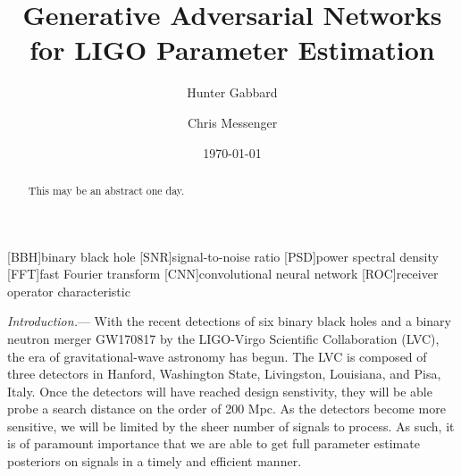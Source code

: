 \documentclass[%
showpacs,
 amsmath,amssymb,
 aps,
 twocolumn,
 prl,
 reprint,
floatfix,
]{revtex4-1}
\newcommand{\dcc}{LIGO-P1700378}
\begin{document}

%
%
\title{Generative Adversarial Networks for LIGO Parameter Estimation}

\author{Hunter Gabbard}
\author{Chris Messenger}

\date{\today}%


%
%
\begin{abstract} 
%
This may be an abstract one day.
%
\end{abstract}





\maketitle

[BBH]{binary black hole}
[SNR]{signal-to-noise ratio}
[PSD]{power spectral density}
[FFT]{fast Fourier transform}
[CNN]{convolutional neural network}
[ROC]{receiver operator characteristic}


%
%

%
%
\textit{Introduction.}--- 
%
With the recent detections of six binary black holes \cite{detection papers} and a binary neutron merger GW170817 \cite{BNS paper} by the LIGO-Virgo Scientific Collaboration (LVC), the era of gravitational-wave astronomy has begun. The LVC is composed of three detectors in Hanford, Washington State, Livingston, Louisiana, and Pisa, Italy. Once the detectors will have reached design senstivity, they will be able probe a search distance on the order of 200 Mpc. As the detectors become more sensitive, we will be limited by the sheer number of signals to process. As such, it is of paramount importance that we are able to get full parameter estimate posteriors on signals in a timely and efficient manner.
\end{document}
